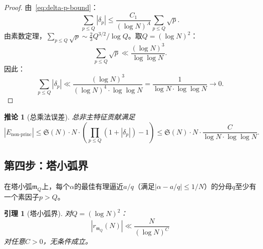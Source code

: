 \documentclass[11pt,a4paper]{article}
\newtheorem{lemma}[theorem]{引理}
\newtheorem{corollary}[theorem]{推论}
\theoremstyle{remark}
\newcommand{\mm}{\mathfrak{m}}
\begin{document}
\begin{proof}
由~\eqref{eq:delta-p-bound}：
\begin{equation}
  \sum_{p \leq Q}|\delta_p| \leq \frac{C_1}{(\log N)^A}
    \sum_{p \leq Q}\sqrt{p}.
\end{equation}
由素数定理，$\sum_{p \leq Q}\sqrt{p} \sim \frac{2}{3}
Q^{3/2}/\log Q$。取$Q = (\log N)^2$：
\begin{equation}
  \sum_{p \leq Q}\sqrt{p} \ll \frac{(\log N)^3}{\log\log N}.
\end{equation}
因此：
\begin{equation}
  \sum_{p \leq Q}|\delta_p| \ll \frac{(\log N)^3}{(\log N)^4 \cdot \log\log N}
    = \frac{1}{\log N \cdot \log\log N} \to 0.
\end{equation}
\end{proof}

\begin{corollary}[总乘法误差]
\label{cor:total-mult}
总非主特征贡献满足
\begin{equation}
\label{eq:total-non-princ}
  |E_{\text{non-princ}}| \leq \mathfrak{S}(N) \cdot N \cdot
    \left(\prod_{p \leq Q}(1+|\delta_p|) - 1\right)
    \leq \mathfrak{S}(N) \cdot N \cdot \frac{C}{\log N \cdot \log\log N}.
\end{equation}
\end{corollary}

\subsection{第四步：塔小弧界}
\label{subsec:tower-minor}

在塔小弧$\mm_Q$上，每个$\alpha$的最佳有理逼近$a/q$（满足$|\alpha - a/q| \leq 1/N$）的分母$q$至少有一个素因子$p > Q$。

\begin{lemma}[塔小弧界]
\label{lem:tower-minor}
对$Q = (\log N)^2$：
\begin{equation}
\label{eq:tower-minor-bound}
  |r_{\mm_Q}(N)| \ll \frac{N}{(\log N)^C}
\end{equation}
对任意$C > 0$，无条件成立。
\end{lemma}
\end{document}
